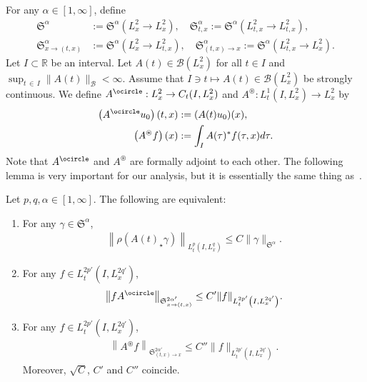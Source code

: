 \documentclass[AHL,Unicode,longabstracts,MathTools,published]{cedram}
\newcommand{\oast}{\circledast}
\newcommand{\CB}{\mathcal{B}}
\newcommand{\FS}{\mathfrak{S}}
\newcommand{\al}{\alpha}
\newcommand{\ga}{\gamma}
\newcommand{\ta}{\tau}
\newcommand{\rh}{\rho}
\newcommand{\I}{\infty}
\newcommand{\tx}{{t,x}}
\newcommand{\st}{\star}
\newcommand{\R}{\mathbb{R}}
\newcommand{\oc}{\ocircle}
\newcommand{\os}{\oast}
\begin{document}
For any $\al \in [1, \I]$, define
\begin{align}
\FS^\alpha &:= \FS^\alpha\left(L^2_x \to L^2_x\right),
\quad \FS^\al_{t,x} := \FS^\al\left(L^2_{t,x} \to L^2_\tx\right), \\
\FS^\al_{x \to (t,x)} &:= \FS^\al\left(L^2_x \to L^2_{t,x}\right),
\quad \FS^\alpha_{(t,x) \to x} := \FS^\al\left(L^2_{t,x} \to L^2_x\right).
\end{align}
Let $I \subset \R$ be an interval. Let $A(t) \in \CB(L^2_x)$ for all $t \in I$ and $\sup_{t \,\in\,I} \|A(t)\|_{\CB} < \I$. Assume that $I \ni t \mapsto A(t) \in \CB(L^2_x)$ be strongly continuous. We define $A^\ocircle : L^2_x \to C_t(I,L^2_x)$ and $A^\oast : L^1_t(I,L^2_x) \to L^2_x$ by
\begin{align}
\left(A^\ocircle u_0\right)(t,x) &:= (A(t)u_0)(x), \\
\left(A^\oast f\right)(x) &:= \int_I A(\ta)^* f(\ta,x) d\ta.
\end{align}
Note that $A^\ocircle$ and $A^\oast$ are formally adjoint to each other. The following lemma is very important for our analysis, but it is essentially the same thing as~\cite[Lemma~3]{2017FS}.
\begin{lemm} \label{DP}
Let $p,q,\al \in [1,\I]$. The following are equivalent:
\begin{enumerate}
\item\label{lemm3.2.1} For any $\ga \in \FS^\al$,
\begin{align}\label{SS}
\left\|\rh(A(t)_\st \ga)\right\|_{L^p_t\left(I,L^q_x\right)} \le C \|\ga\|_{\FS^\al}.
\end{align}
\item\label{lemm3.2.2} For any $f \in L^{2p'}_t(I,L^{2q'}_x)$,
\begin{align}\label{HSS}
\left\|f A^\oc\right\|_{\FS^{2\al'}_{x \to (\tx)}} \le C'\|f\|_{L^{2p'}_t\left(I,L^{2q'}_x\right)}.
\end{align}
\item\label{lemm3.2.3} For any $f \in L^{2p'}_t(I,L^{2q'}_x)$,
\begin{align}\label{HSS-second}
\left\|A^\os f\right\|_{\FS^{2\al'}_{(\tx) \to x}} \le C''\|f\|_{L^{2p'}_t\left(I,L^{2q'}_x\right)}.
\end{align}
Moreover, $\sqrt{C}$, $C'$ and $C''$ coincide.
\end{enumerate}
\end{lemm}
\end{document}
